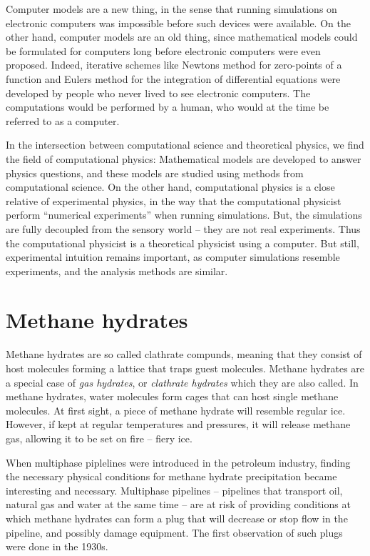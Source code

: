 Computer models are a new thing, in the sense that running simulations on electronic computers was impossible before such devices were available. On the other hand, computer models are an old thing, since mathematical models could be formulated for computers long before electronic computers were even proposed. Indeed, iterative schemes like Newtons method for zero-points of a function and Eulers method for the integration of differential equations were developed by people who never lived to see electronic computers. The computations would be performed by a human, who would at the time be referred to as a computer. 

In the intersection between computational science and theoretical physics, we find the field of computational physics: Mathematical models are developed to answer physics questions, and these models are studied using methods from computational science. On the other hand, computational physics is a close relative of experimental physics, in the way that the computational physicist perform ``numerical experiments'' when running simulations. But, the simulations are fully decoupled from the sensory world -- they are not real experiments. Thus the computational physicist is a theoretical physicist using a computer. But still, experimental intuition remains important, as computer simulations resemble experiments, and the analysis methods are similar.

\section{Methane hydrates}
Methane hydrates are so called clathrate compunds, meaning that they consist of host molecules forming a lattice that traps guest molecules. Methane hydrates are a special case of \emph{gas hydrates}, or \emph{clathrate hydrates} which they are also called. In methane hydrates, water molecules form cages that can host single methane molecules. At first sight, a piece of methane hydrate will resemble regular ice. However, if kept at regular temperatures and pressures, it will release methane gas, allowing it to be set on fire -- fiery ice. 

When multiphase piplelines were introduced in the petroleum industry, finding the necessary physical conditions for methane hydrate precipitation became interesting and necessary. Multiphase pipelines -- pipelines that transport oil, natural gas and water at the same time -- are at risk of providing conditions at which methane hydrates can form a plug that will decrease or stop flow in the pipeline, and possibly damage equipment. The first observation of such plugs were done in the 1930s.

